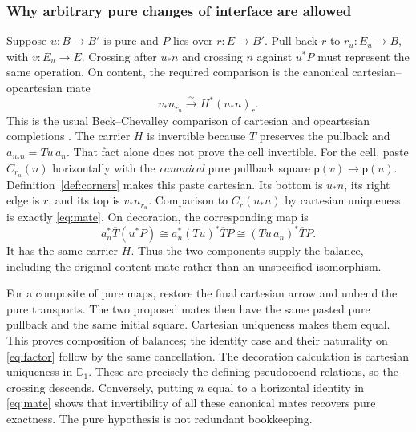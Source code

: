 \documentclass[11pt]{article}
\numberwithin{equation}{section}
\theoremstyle{definition}\newtheorem{definition}[theorem]{Definition}
\newcommand{\D}{\mathbb D}\newcommand{\N}{\mathbb N}
\newcommand{\iso}{\xrightarrow{\sim}}\newcommand{\ea}{e}\newcommand{\un}{\mathbf1}\newcommand{\Tt}{\overline T}
\newcommand{\pure}{\mathsf p}\newcommand{\grade}{\mathsf G}
\begin{document}
\subsubsection{Why arbitrary pure changes of interface are allowed}
Suppose $u:B\to B'$ is pure and $P$ lies over $r:E\to B'$. Pull back
$r$ to $r_u:E_u\to B$, with $v:E_u\to E$. Crossing after $u_*n$ and
crossing $n$ against $u^*P$ must represent the same operation. On content,
the required comparison is the canonical cartesian--opcartesian mate
\begin{equation}\label{eq:mate}
                    v_*n_{r_u}\iso H^*(u_*n)_r.
\end{equation}
This is the usual Beck--Chevalley comparison of cartesian and
opcartesian completions \cite[Def.~13.21 and Lem.~16.1]{shulman}.
The carrier $H$ is invertible because $T$ preserves the pullback and
$a_{u_*n}=Tu\,a_n$. That fact alone does not prove the cell invertible.
For the cell, paste $C_{r_u}(n)$ horizontally with the \emph{canonical}
pure pullback square $\pure(v)\to\pure(u)$. Definition~\ref{def:corners}
makes this paste cartesian. Its bottom is $u_*n$, its right edge is $r$,
and its top is $v_*n_{r_u}$. Comparison to $C_r(u_*n)$ by cartesian
uniqueness is exactly \eqref{eq:mate}. On decoration, the corresponding
map is
\[
 a_n^*\Tt(u^*P)\cong a_n^*(Tu)^*\Tt P
                  \cong(Tu\,a_n)^*\Tt P.
\]
It has the same carrier $H$. Thus the two components supply the balance,
including the original content mate rather than an unspecified isomorphism.

For a composite of pure maps, restore the final cartesian arrow and
unbend the pure transports. The two proposed mates then have the same
pasted pure pullback and the same initial square. Cartesian uniqueness
makes them equal. This proves composition of balances; the identity case
and their naturality on \eqref{eq:factor} follow by the same cancellation.
The decoration calculation is cartesian uniqueness in $\D_1$.
These are precisely the defining pseudocoend relations, so the crossing
descends. Conversely, putting $n$ equal to a horizontal identity in
\eqref{eq:mate} shows that invertibility of all these canonical mates
recovers pure exactness. The pure hypothesis is not redundant bookkeeping.
\end{document}
